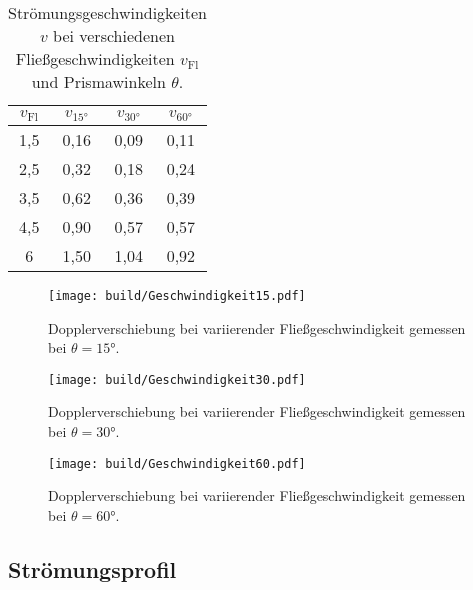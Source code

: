 \begin{table}[H]
  \centering
  \caption{Strömungsgeschwindigkeiten $v$ bei verschiedenen Fließgeschwindigkeiten $v_\text{Fl}$ und Prismawinkeln $\theta$.}
  \label{tab:v}
  \begin{tabular}{S[table-format=1.1] S[table-format=1.2] S[table-format=1.2] S[table-format=1.2]}
      \toprule
      {$v_\text{Fl}$}&{$v_\text{15°}$}&{$v_\text{30°}$}&{$v_\text{60°}$}\\
      ,5 & 0,16 & 0,09 & 0,11 \\
      2,5 & 0,32 & 0,18 & 0,24 \\
      3,5 & 0,62 & 0,36 & 0,39 \\
      4,5 & 0,90 & 0,57 & 0,57 \\
      6 & 1,50 & 1,04 & 0,92 \\
      \bottomrule
  \end{tabular}
\end{table}

\begin{figure}[H]
  \centering
  \texttt{[image: build/Geschwindigkeit15.pdf]}
  \caption{Dopplerverschiebung bei variierender Fließgeschwindigkeit gemessen bei $\theta=15°$.}
  \label{fig:v15}
\end{figure}

\begin{figure}[H]
  \centering
  \texttt{[image: build/Geschwindigkeit30.pdf]}
  \caption{Dopplerverschiebung bei variierender Fließgeschwindigkeit gemessen bei $\theta=30°$.}
  \label{fig:v30}
\end{figure}

\begin{figure}[H]
  \centering
  \texttt{[image: build/Geschwindigkeit60.pdf]}
  \caption{Dopplerverschiebung bei variierender Fließgeschwindigkeit gemessen bei $\theta=60°$.}
  \label{fig:v60}
\end{figure}

\subsection{Strömungsprofil}

